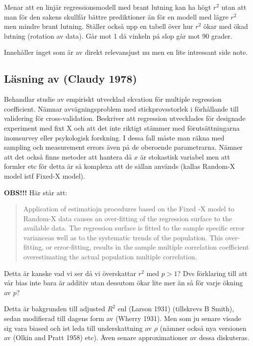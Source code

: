 \documentclass[]{article}
\begin{document}
Menar att en linjär regressionsmodell med brant lutning kan ha högt
\(r^2\) utan att man för den sakens skullfår bättre prediktioner än för
en modell med lägre \(r^2\) men mindre brant lutning. Ställer också upp
en tabell över hur \(r^2\) ökar med ökad lutning (rotation av data). Går
mot 1 då vinkeln på slop går mot 90 grader.

Innehåller inget som är av direkt relevansjust nu men en lite intressant
side note.

\subsection{Läsning av (Claudy 1978)}\label{lasning-av-claudy1978}

Behandlar studie av empiriskt utvecklad ekvation för multiple regression
coefficient. Nämnar avvägningsproblem med stickprovsstorlek i
förhållande till validering för cross-validation. Beskriver att
regression utvecklades för designade experiment med fixt X och att det
inte riktigt stämmer med förutsättningarna inomsurvey eller psykologisk
forskning. I dessa fall måste man räkna med sampling och measurement
errors även på de oberoende parametrarna. Nämner att det också finns
metoder att hantera då \(x\) är stokastisk variabel men att formler etc
för detta är så komplexa att de sällan används (kallas Random-X model
istf Fixed-X model).

\textbf{OBS!!!} Här står att:

\begin{quote}
Application of estimatiojn procedures based on the Fixed -X model to
Random-X data causes an over-fitting of the regression surface to the
available data. The regression surface is fitted to the sample specific
error varianceas well as to the systematic trends of the population.
This over-fitting, or error-fitting, results in the sample multiple
correlation coefficient overestimating the actual population multiple
correlation.
\end{quote}

Detta är kanske vad vi ser då vi överskattar \(r^2\) med \(p> 1\)? Dvs
förklaring till att vår bias inte bara är additiv utan dessutom ökar
lite mer än så för varje ökning av \(p\)?

Detta är bakgrunden till adjusted \(R^2\) enl (Larson 1931) (tillskrevs
B Smith), sedan modifierad till dagens form av (Wherry 1931). Men som ju
senare visade sig vara biased och ist leda till underskattning av
\(\rho\) (nämner också nya versionen av (Olkin and Pratt 1958) etc).
Även senare approximationer av dessa diskuteras.
\end{document}
